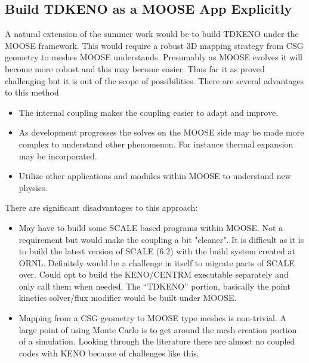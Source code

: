 \documentclass[11pt]{article}
\begin{document}
\subsection{Build TDKENO as a MOOSE App Explicitly}  
A natural extension of the summer work would be to build TDKENO under the MOOSE framework.  This would require a robust 3D mapping strategy from CSG geometry to meshes MOOSE understands.  Presumably as MOOSE evolves it will become more robust and this may become easier.  Thus far it as proved challenging but it is out of the scope of possibilities.   
There are several advantages to this method
\begin{itemize}
    \item The internal coupling makes the coupling easier to adapt and improve. 
    \item As development progresses the solves on the MOOSE side may be made more complex to understand other phenomenon. For instance thermal expansion may be incorporated.  
    \item Utilize other applications and modules within MOOSE to understand new physics. 
\end{itemize}
There are significant disadvantages to this approach:

\begin{itemize}
    \item May have to build some SCALE based programs within MOOSE. Not a requirement but would make the coupling a bit "cleaner".  It is difficult as it is to build the latest version of SCALE (6.2) with the build system created at ORNL. Definitely would be a challenge in itself to migrate parts of SCALE over.
    Could opt to build the KENO/CENTRM executable separately and only call them when needed.  The “TDKENO” portion, basically the point kinetics solver/flux modifier would be built under MOOSE.
    \item Mapping from a CSG geometry to MOOSE type meshes is non-trivial.  A large point of using Monte Carlo is to get around the mesh creation portion of a simulation. Looking through the literature there are almost no coupled codes with KENO because of challenges like this.   
\end{itemize}
\end{document}
